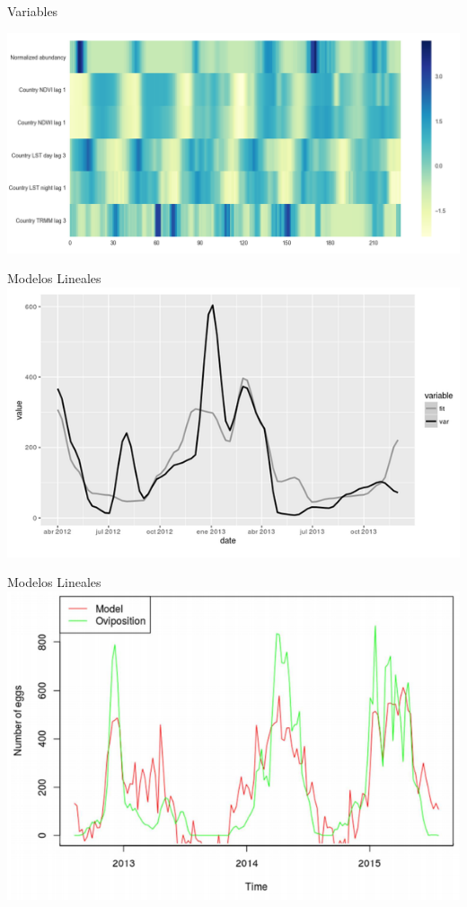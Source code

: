 \documentclass[10pt]{beamer}
\begin{document}
\begin{frame}{Variables}


  \includegraphics[width=1\textwidth]{selected_variables.png}


\end{frame}

\begin{frame}{Modelos Lineales}
  \includegraphics[width=\textwidth]{lineal1.png}
\end{frame}

\begin{frame}{Modelos Lineales}
  \includegraphics[width=\textwidth]{lineal2.png}
\end{frame}
\end{document}
